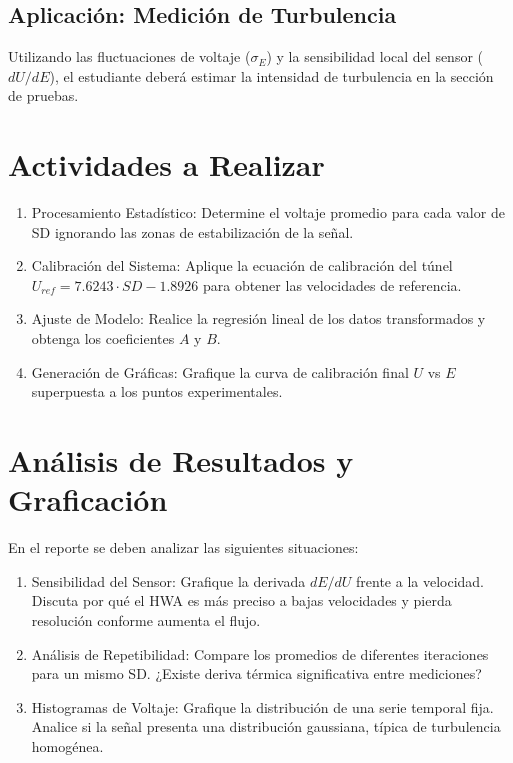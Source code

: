 \documentclass[11pt, a4paper]{article}
\begin{document}
\subsection{Aplicación: Medición de Turbulencia}
Utilizando las fluctuaciones de voltaje ($\sigma_E$) y la sensibilidad local del sensor ($dU/dE$), el estudiante deberá estimar la intensidad de turbulencia en la sección de pruebas.

\section{Actividades a Realizar}
\begin{enumerate}
    \item Procesamiento Estadístico: Determine el voltaje promedio para cada valor de SD ignorando las zonas de estabilización de la señal.
    \item Calibración del Sistema: Aplique la ecuación de calibración del túnel $U_{ref} = 7.6243 \cdot SD - 1.8926$ para obtener las velocidades de referencia.
    \item Ajuste de Modelo: Realice la regresión lineal de los datos transformados y obtenga los coeficientes $A$ y $B$.
    \item Generación de Gráficas: Grafique la curva de calibración final $U$ vs $E$ superpuesta a los puntos experimentales.
\end{enumerate}

\section{Análisis de Resultados y Graficación}
En el reporte se deben analizar las siguientes situaciones:
\begin{enumerate}
    \item Sensibilidad del Sensor: Grafique la derivada $dE/dU$ frente a la velocidad. Discuta por qué el HWA es más preciso a bajas velocidades y pierda resolución conforme aumenta el flujo.
    \item Análisis de Repetibilidad: Compare los promedios de diferentes iteraciones para un mismo SD. ¿Existe deriva térmica significativa entre mediciones?
    \item Histogramas de Voltaje: Grafique la distribución de una serie temporal fija. Analice si la señal presenta una distribución gaussiana, típica de turbulencia homogénea.
\end{enumerate}
\end{document}
